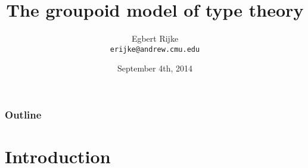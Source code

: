 \documentclass{beamer}
\title{The groupoid model of type theory}
\author[Egbert]{Egbert Rijke \\ \texttt{erijke@andrew.cmu.edu}}
\date{September 4th, 2014}
\institute{Carnegie Mellon University}
\begin{document}
\begin{frame}
  \titlepage
\end{frame}

\begin{frame}
  \frametitle{Outline}
  \tableofcontents[pausesections]
\end{frame}

\section{Introduction}
\end{document}

